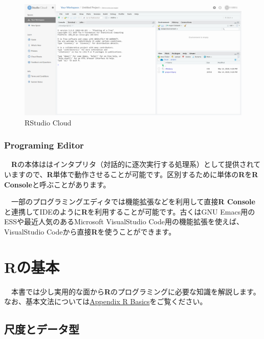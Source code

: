 \documentclass[
  12pt,
]{book}
\begin{document}
\begin{figure}[H]

{\centering \includegraphics[width=0.9\linewidth,]{./fig/RStudio/RSCloud_01} 

}

\caption{RStudio Cloud}\label{fig:unnamed-chunk-25}
\end{figure}

\hypertarget{programing-editor}{%
\subsection{Programing Editor}\label{programing-editor}}

　\textbf{R}の本体ははインタプリタ（対話的に逐次実行する処理系）として提供されていますので、\textbf{R}単体で動作させることが可能です。区別するために単体の\textbf{R}を\textbf{R Console}と呼ぶことがあります。

　一部のプログラミングエディタでは機能拡張などを利用して直接\textbf{R Console}と連携してIDEのように\textbf{R}を利用することが可能です。古くはGNU Emacs用のESSや最近人気のあるMicrosoft VisualStudio Code用の機能拡張を使えば、VisualStudio Codeから直接\textbf{R}を使うことができます。

\hypertarget{rux306eux57faux672c}{%
\chapter{Rの基本}\label{rux306eux57faux672c}}

　本書では少し実用的な面から\textbf{R}のプログラミングに必要な知識を解説します。なお、基本文法については\protect\hyperlink{Appendix-RBasics}{Appendix R Basics}をご覧ください。

\hypertarget{ux5c3aux5ea6ux3068ux30c7ux30fcux30bfux578b}{%
\section{尺度とデータ型}\label{ux5c3aux5ea6ux3068ux30c7ux30fcux30bfux578b}}
\end{document}
